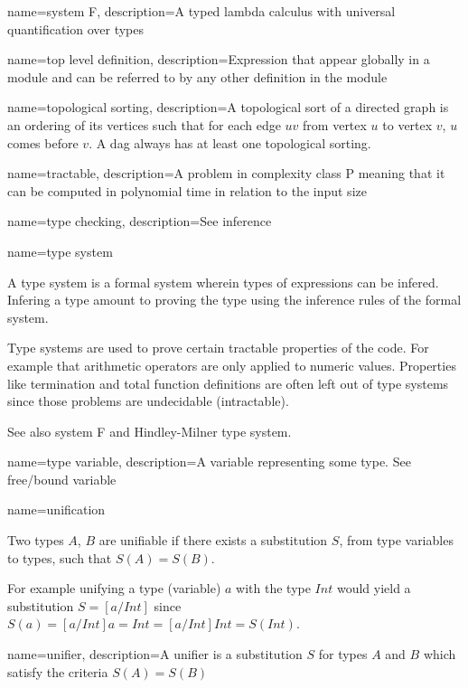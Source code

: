 { name={system F},
  description={A typed lambda calculus with universal quantification over types}
}

{ name={top level definition},
  description={Expression that appear globally in a module and can be referred to by any other definition in the module}
}

{ name={topological sorting},
  description={A topological sort of a directed graph is an ordering of its vertices such that for each edge $uv$ from vertex $u$ to vertex $v$, $u$ comes before $v$. A \acrshort{dag} always has at least one topological sorting.}
}

{ name={tractable},
  description={A problem in complexity class P meaning that it can be computed in polynomial time in relation to the input size}
}

{ name={type checking},
  description={See inference}
}

{ name={type system} }
{A type system is a formal system wherein types of expressions can be infered. Infering a type amount to proving the type using the inference rules of the formal system.

Type systems are used to prove certain tractable properties of the code. For example that arithmetic operators are only applied to numeric values. Properties like termination and total function definitions are often left out of type systems since those problems are undecidable (intractable).

See also system F and Hindley-Milner type system.
}

{ name={type variable},
  description={A variable representing some type. See free/bound variable}
}

{ name={unification} }
{Two types $A$, $B$ are unifiable if there exists a substitution $S$, from type variables to types, such that $S(A) = S(B)$.

For example unifying a type (variable) $a$ with the type $Int$ would yield a substitution $S = [a/Int]$ since $S(a) = [a/Int]a = Int = [a/Int]Int = S(Int)$.
}

{ name={unifier},
  description={A unifier is a substitution $S$ for types $A$ and $B$ which satisfy the criteria $S(A) = S(B)$}
}


